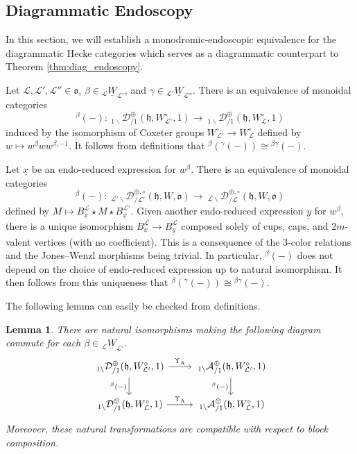 \documentclass{amsart}
\newcommand{\scrL}{\mathcal{L}}
\newcommand{\fr}[1]{\mathfrak{#1}}
\DeclareMathOperator{\Abe}{A}
\newcommand{\EWmon}[2]{\:_{#1 \backslash} \mathcal{D}_{/ #2} }
\newcommand{\Amon}[2]{\:_{#1 \backslash} \mathcal{A}_{/ #2} }
\newcommand{\uW}[2]{{}_{#1}\underline{W}_{#2}}
\newcommand{\ux}{\underline{x}}
\newcommand{\uy}{\underline{y}}
\newtheorem{lemma}[subsubsection]{Lemma}
\theoremstyle{definition}
\numberwithin{equation}{subsection}
\begin{document}
\subsection{Diagrammatic Endoscopy}

In this section, we will establish a monodromic-endoscopic equivalence for the diagrammatic Hecke categories which serves as a diagrammatic counterpart to Theorem \ref{thm:diag_endoscopy}.

Let $\scrL, \scrL', \scrL'' \in \fr{o}$, $\beta \in \uW{\scrL}{\scrL'}$, and $\gamma \in \uW{\scrL'}{\scrL''}$. There is an equivalence of monoidal categories
\[{}^{\beta} (-) : \EWmon{1}{1}^{\oplus} (\fr{h}, W_{\scrL'}^{\circ}, 1) \to \EWmon{1}{1}^{\oplus} (\fr{h}, W_{\scrL}^{\circ}, 1) \]
induced by the isomorphism of Coxeter groups $W_{\scrL'}^{\circ} \to W_{\scrL}^{\circ}$ defined by $w \mapsto w^{\beta} w w^{\beta, -1}$.
It follows from definitions that ${}^{\beta} ( {}^{\gamma} (-)) \cong {}^{\beta \gamma} (-)$.

Let $\ux$ be an endo-reduced expression for $w^{\beta}$. 
There is an equivalence of monoidal categories
\[{}^{\beta} (-) : \EWmon{\scrL'}{\scrL'}^{\oplus, \circ} (\fr{h}, W, \fr{o}) \to \EWmon{\scrL}{\scrL}^{\oplus, \circ} (\fr{h}, W, \fr{o}) \]
defined by $M \mapsto B_{\ux}^{\scrL} \star M \star B_{\overline{\ux}}^{\scrL'}$. Given another endo-reduced expression $\uy$ for $w^{\beta}$, there is a unique isomorphism $B_{\ux}^{\scrL} \to B_{\uy}^{\scrL}$ composed solely of cups, caps, and $2m$-valent vertices (with no coefficient).
This is a consequence of the 3-color relations and the Jones--Wenzl morphisms being trivial. In particular, ${}^{\beta} (-)$ does not depend on the choice of endo-reduced expression up to natural isomorphism.
It then follows from this uniqueness that ${}^{\beta} ( {}^{\gamma} (-)) \cong {}^{\beta \gamma} (-)$.

The following lemma can easily be checked from definitions.
\begin{lemma}\label{lem:Phi_and_block_conj}
    There are natural isomorphisms making the following diagram commute for each $\beta \in \uW{\scrL}{\scrL'}$.
    \[
        \begin{tikzcd}
            {\EWmon{1}{1}^{\oplus} (\fr{h}, W_{\scrL'}^{\circ}, 1)} \arrow[d, "{}^{\beta} (-)"'] \arrow[r, "\Upsilon_{\Abe}"] & {\Amon{1}{1}^{\oplus} (\fr{h}, W_{\scrL'}^{\circ}, 1)} \arrow[d, "{}^{\beta} (-)"'] \\
            {\EWmon{1}{1}^{\oplus} (\fr{h}, W_{\scrL}^{\circ}, 1)} \arrow[r, "\Upsilon_{\Abe}"]                             & {\Amon{1}{1}^{\oplus} (\fr{h}, W_{\scrL}^{\circ}, 1)}                            
            \end{tikzcd}
    \]
    Moreover, these natural transformations are compatible with respect to block composition.
\end{lemma}
\end{document}
